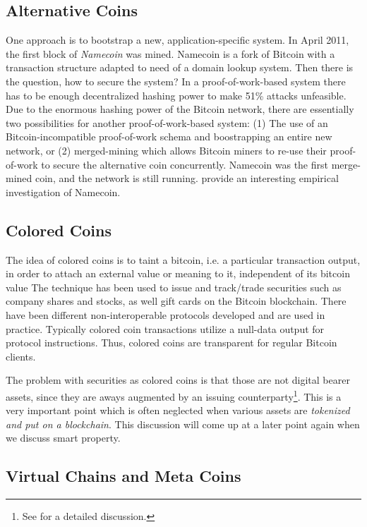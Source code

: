 \subsection{Alternative Coins}
One approach is to bootstrap a new, application-specific system. In April 2011, the first block of \emph{Namecoin} was mined. Namecoin is a fork of Bitcoin with a transaction structure adapted to need of a domain lookup system. Then there is the question, how to secure the system? In a proof-of-work-based system there has to be enough decentralized hashing power to make 51\% attacks unfeasible. Due to the enormous hashing power of the Bitcoin network, there are essentially two possibilities for another proof-of-work-based system: (1) The use of an Bitcoin-incompatible proof-of-work schema and boostrapping an entire new network, or (2) merged-mining which allows Bitcoin miners to re-use their proof-of-work to secure the alternative coin concurrently. 
Namecoin was the first merge-mined coin, and the network is still running. \cite{kalodner2015empirical} provide an interesting empirical investigation of Namecoin. 

\subsection{Colored Coins}

The idea of colored coins is to taint a bitcoin, i.e. a particular transaction output, in order to attach an external value or meaning to it, independent of its bitcoin value \parencite{coloredcoins} The technique has been used to issue and track/trade securities such as company shares and stocks, as well gift cards on the Bitcoin blockchain. There have been different non-interoperable protocols developed and are used in practice. Typically colored coin transactions utilize a null-data output for protocol instructions. Thus, colored coins are transparent for regular Bitcoin clients.

The problem with securities as colored coins is that those are not digital bearer assets, since they are aways augmented by an issuing counterparty\footnote{See \parencite{swanson2015} for a detailed discussion.}. This is a very important point which is often neglected when various assets are \emph{tokenized and put on a blockchain}. This discussion will come up at a later point again when we discuss smart property.

\subsection{Virtual Chains and Meta Coins}

